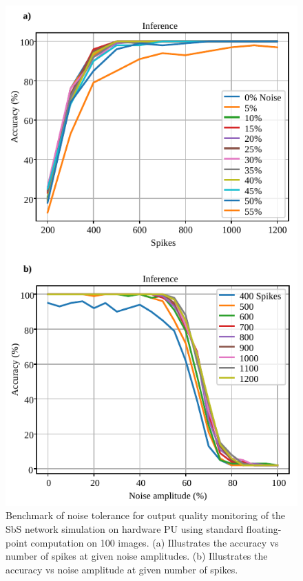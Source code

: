 \begin{figure}[h!]
	\centering
	\includegraphics[width=1\columnwidth]{../figures/accuracy_vs_noise_pu_fp.pdf}
	\caption{Benchmark of noise tolerance for output quality monitoring of the SbS network simulation on hardware PU using standard floating-point computation on 100 images. (a) Illustrates the accuracy vs number of spikes at given noise amplitudes. (b) Illustrates the accuracy vs noise amplitude at given number of spikes.}
	\label{fig:accuracy_vs_noise_pu_fp}
\end{figure}


